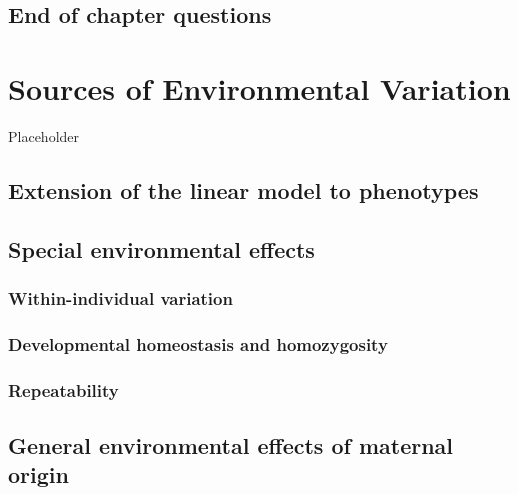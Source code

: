 \documentclass[
]{book}
\begin{document}
\hypertarget{end-of-chapter-questions-2}{%
\section{End of chapter questions}\label{end-of-chapter-questions-2}}

\hypertarget{sources-of-environmental-variation}{%
\chapter{Sources of Environmental Variation}\label{sources-of-environmental-variation}}

Placeholder

\hypertarget{extension-of-the-linear-model-to-phenotypes}{%
\section{Extension of the linear model to phenotypes}\label{extension-of-the-linear-model-to-phenotypes}}

\hypertarget{special-environmental-effects}{%
\section{Special environmental effects}\label{special-environmental-effects}}

\hypertarget{within-individual-variation}{%
\subsection{Within-individual variation}\label{within-individual-variation}}

\hypertarget{developmental-homeostasis-and-homozygosity}{%
\subsection{Developmental homeostasis and homozygosity}\label{developmental-homeostasis-and-homozygosity}}

\hypertarget{repeatability}{%
\subsection{Repeatability}\label{repeatability}}

\hypertarget{general-environmental-effects-of-maternal-origin}{%
\section{General environmental effects of maternal origin}\label{general-environmental-effects-of-maternal-origin}}
\end{document}
